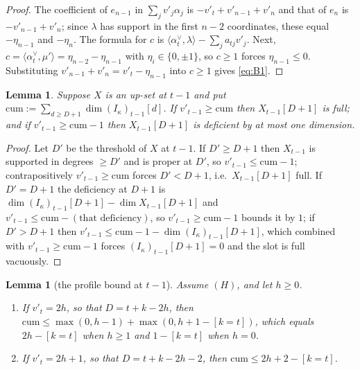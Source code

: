 \documentclass[reqno]{amsart}
\theoremstyle{plain}
\newtheorem{lemma}[theorem]{Lemma}
\theoremstyle{definition}
\newcommand{\la}{\lambda}
\newcommand{\al}{\alpha}
\newcommand{\ka}{\kappa}
\begin{document}
\begin{proof}
The coefficient of $e_{n-1}$ in $\sum_jv'_j\al_j$ is $-v'_t+v'_{n-1}+v'_n$ and
that of $e_n$ is $-v'_{n-1}+v'_n$; since $\la$ has support in the first $n-2$
coordinates, these equal $-\eta_{n-1}$ and $-\eta_n$.  The formula for $c$ is
$\langle\al_t^\vee,\la\rangle-\sum_ja_{tj}v'_j$.  Next,
$c=\langle\al_t^\vee,\mu'\rangle=\eta_{n-2}-\eta_{n-1}$ with
$\eta_i\in\{0,\pm1\}$, so $c\ge1$ forces $\eta_{n-1}\le0$.  Substituting
$v'_{n-1}+v'_n=v'_t-\eta_{n-1}$ into $c\ge1$ gives \eqref{eq:B1}.
\end{proof}

\begin{lemma}\label{lem:B2}
Suppose $X$ is an up-set at $t-1$ and put
$\mathrm{cum}:=\sum_{d\ge D+1}\dim(I_\ka)_{t-1}[d]$.  If
$v'_{t-1}\ge\mathrm{cum}$ then $X_{t-1}[D+1]$ is full; and if
$v'_{t-1}\ge\mathrm{cum}-1$ then $X_{t-1}[D+1]$ is deficient by at most one
dimension.
\end{lemma}

\begin{proof}
Let $D'$ be the threshold of $X$ at $t-1$.  If $D'\ge D+1$ then $X_{t-1}$ is
supported in degrees $\ge D'$ and is proper at $D'$, so
$v'_{t-1}\le\mathrm{cum}-1$; contrapositively $v'_{t-1}\ge\mathrm{cum}$ forces
$D'<D+1$, i.e.\ $X_{t-1}[D+1]$ full.  If $D'=D+1$ the deficiency at $D+1$ is
$\dim(I_\ka)_{t-1}[D+1]-\dim X_{t-1}[D+1]$ and
$v'_{t-1}\le\mathrm{cum}-(\text{that deficiency})$, so
$v'_{t-1}\ge\mathrm{cum}-1$ bounds it by $1$; if $D'>D+1$ then
$v'_{t-1}\le\mathrm{cum}-1-\dim(I_\ka)_{t-1}[D+1]$, which combined with
$v'_{t-1}\ge\mathrm{cum}-1$ forces $(I_\ka)_{t-1}[D+1]=0$ and the slot is full
vacuously.
\end{proof}

\begin{lemma}[the profile bound at $t-1$]\label{lem:cumbound}
Assume $(H)$, and let $h\ge0$.
\begin{enumerate}
\item[\textup{(i)}] If $v'_t=2h$, so that $D=t+k-2h$, then
$\mathrm{cum}\le\max(0,h-1)+\max(0,h+1-[k=t])$, which equals $2h-[k=t]$ when
$h\ge1$ and $1-[k=t]$ when $h=0$.
\item[\textup{(ii)}] If $v'_t=2h+1$, so that $D=t+k-2h-2$, then
$\mathrm{cum}\le 2h+2-[k=t]$.
\end{enumerate}
\end{lemma}
\end{document}
